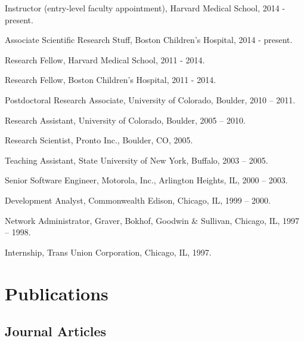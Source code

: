 \documentclass[letterpaper]{article}
\renewenvironment{itemize}{
  \begin{list}{}{
    \setlength{\leftmargin}{1.5em}
  }
}{
  \end{list}
}
\begin{document}
\begin{itemize}
\item Instructor (entry-level faculty appointment), Harvard Medical School, 2014 - present.
\item Associate Scientific Research Stuff, Boston Children's Hospital, 2014 - present.
\item Research Fellow, Harvard Medical School, 2011 - 2014.
\item Research Fellow, Boston Children's Hospital, 2011 - 2014.
\item Postdoctoral Research Associate, University of Colorado, Boulder, 2010 -- 2011.
\item Research Assistant, University of Colorado, Boulder, 2005 -- 2010.
\item Research Scientist, Pronto Inc., Boulder, CO, 2005.
\item Teaching Assistant, State University of New York, Buffalo, 2003 -- 2005.
\item Senior Software Engineer, Motorola, Inc., Arlington Heights, IL, 2000 -- 2003.
\item Development Analyst, Commonwealth Edison, Chicago, IL, 1999 -- 2000.
\item Network Administrator, Graver, Bokhof, Goodwin \& Sullivan, Chicago, IL, 1997 -- 1998.
\item Internship, Trans Union Corporation, Chicago, IL, 1997.
\end{itemize}

\section*{Publications}

\subsection*{Journal Articles}
\end{document}
